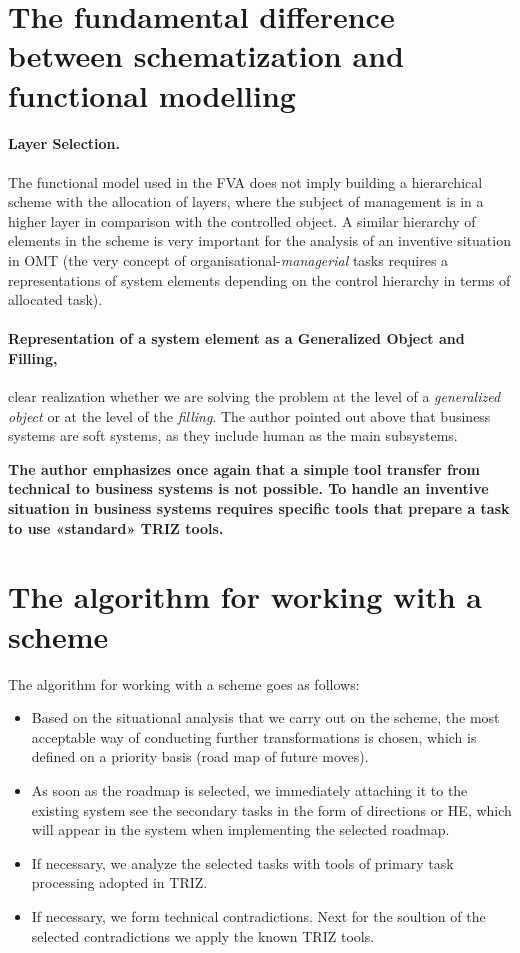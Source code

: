 \documentclass[11pt,a4paper]{book}
\begin{document}
\section{The fundamental difference between schematization and functional
  modelling} 

\paragraph{Layer Selection.}
The functional model used in the FVA does not imply building a hierarchical
scheme with the allocation of layers, where the subject of management is in a
higher layer in comparison with the controlled object. A similar hierarchy of
elements in the scheme is very important for the analysis of an inventive
situation in OMT (the very concept of organisational-\emph{managerial} tasks
requires a representations of system elements depending on the control hierarchy
in terms of allocated task).

\paragraph{Representation of a system element as a Generalized Object and
  Filling, }
clear realization whether we are solving the problem at the level of a
\emph{generalized object} or at the level of the \emph{filling}. The author
pointed out above that business systems are soft systems, as they include
human as the main subsystems.

\textbf{The author emphasizes once again that a simple tool transfer from
  technical to business systems is not possible. To handle an inventive
  situation in business systems requires specific tools that prepare a task to
  use «standard» TRIZ tools.}

\section{The algorithm for working with a scheme}

The algorithm for working with a scheme goes as follows:
\begin{itemize}
\item Based on the situational analysis that we carry out on the scheme, the
  most acceptable way of conducting further transformations is chosen, which
  is defined on a priority basis (road map of future moves).
\item As soon as the roadmap is selected, we immediately attaching it to the
  existing system see the secondary tasks in the form of directions or HE,
  which will appear in the system when implementing the selected roadmap.
\item If necessary, we analyze the selected tasks with tools of primary task
  processing adopted in TRIZ.
\item If necessary, we form technical contradictions.  Next for the soultion
  of the selected contradictions we apply the known TRIZ tools.
\end{itemize}
\end{document}
